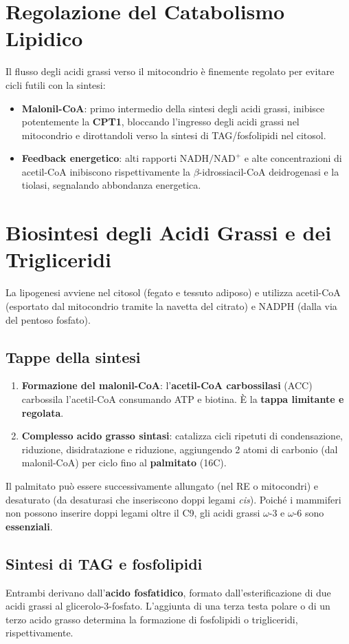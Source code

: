 \documentclass[12pt,a4paper]{report}
\begin{document}
\section{Regolazione del Catabolismo Lipidico}
Il flusso degli acidi grassi verso il mitocondrio è finemente regolato per evitare cicli futili con la sintesi:
\begin{itemize}
\item \textbf{Malonil-CoA}: primo intermedio della sintesi degli acidi grassi, inibisce potentemente la \textbf{CPT1}, bloccando l'ingresso degli acidi grassi nel mitocondrio e dirottandoli verso la sintesi di TAG/fosfolipidi nel citosol.
\item \textbf{Feedback energetico}: alti rapporti \(\mathrm{NADH}/\mathrm{NAD^+}\) e alte concentrazioni di acetil-CoA inibiscono rispettivamente la \(\beta\)-idrossiacil-CoA deidrogenasi e la tiolasi, segnalando abbondanza energetica.
\end{itemize}

\section{Biosintesi degli Acidi Grassi e dei Trigliceridi}
La lipogenesi avviene nel citosol (fegato e tessuto adiposo) e utilizza acetil-CoA (esportato dal mitocondrio tramite la navetta del citrato) e NADPH (dalla via del pentoso fosfato).
\subsection{Tappe della sintesi}
\begin{enumerate}
\item \textbf{Formazione del malonil-CoA}: l'\textbf{acetil-CoA carbossilasi} (ACC) carbossila l'acetil-CoA consumando ATP e biotina. È la \textbf{tappa limitante e regolata}.
\item \textbf{Complesso acido grasso sintasi}: catalizza cicli ripetuti di condensazione, riduzione, disidratazione e riduzione, aggiungendo 2 atomi di carbonio (dal malonil-CoA) per ciclo fino al \textbf{palmitato} (16C).
\end{enumerate}
Il palmitato può essere successivamente allungato (nel RE o mitocondri) e desaturato (da desaturasi che inseriscono doppi legami \textit{cis}). Poiché i mammiferi non possono inserire doppi legami oltre il C9, gli acidi grassi \(\omega\)-3 e \(\omega\)-6 sono \textbf{essenziali}.
\subsection{Sintesi di TAG e fosfolipidi}
Entrambi derivano dall'\textbf{acido fosfatidico}, formato dall'esterificazione di due acidi grassi al glicerolo-3-fosfato. L'aggiunta di una terza testa polare o di un terzo acido grasso determina la formazione di fosfolipidi o trigliceridi, rispettivamente.
\end{document}
